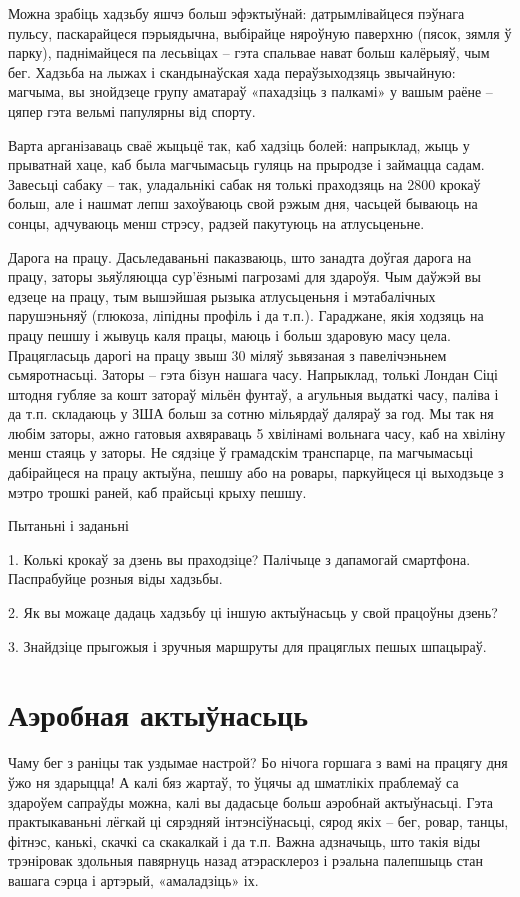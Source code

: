Можна зрабіць хадзьбу яшчэ больш эфэктыўнай: датрымлівайцеся пэўнага пульсу, паскарайцеся пэрыядычна, выбірайце няроўную паверхню (пясок, зямля ў парку), паднімайцеся па лесьвіцах – гэта спальвае нават больш калёрыяў, чым бег. Хадзьба на лыжах і скандынаўская хада пераўзыходзяць звычайную: магчыма, вы знойдзеце групу аматараў «пахадзіць з палкамі» у вашым раёне – цяпер гэта вельмі папулярны від спорту.

Варта арганізаваць сваё жыцьцё так, каб хадзіць болей: напрыклад, жыць у прыватнай хаце, каб была магчымасьць гуляць на прыродзе і займацца садам. Завесьці сабаку – так, уладальнікі сабак ня толькі праходзяць на 2800 крокаў больш, але і нашмат лепш захоўваюць свой рэжым дня, часьцей бываюць на сонцы, адчуваюць менш стрэсу, радзей пакутуюць на атлусьценьне.

Дарога на працу. Дасьледаваньні паказваюць, што занадта доўгая дарога на працу, заторы зьяўляюцца сур'ёзнымі пагрозамі для здароўя. Чым даўжэй вы едзеце на працу, тым вышэйшая рызыка атлусьценьня і мэтабалічных парушэньняў (глюкоза, ліпідны профіль і да т.п.). Гараджане, якія ходзяць на працу пешшу і жывуць каля працы, маюць і больш здаровую масу цела. Працягласьць дарогі на працу звыш 30 міляў зьвязаная з павелічэньнем сьмяротнасьці. Заторы – гэта бізун нашага часу. Напрыклад, толькі Лондан Сіці штодня губляе за кошт затораў мільён фунтаў, а агульныя выдаткі часу, паліва і да т.п. складаюць у ЗША больш за сотню мільярдаў даляраў за год. Мы так ня любім заторы, ажно гатовыя ахвяраваць 5 хвілінамі вольнага часу, каб на хвіліну менш стаяць у заторы. Не сядзіце ў грамадскім транспарце, па магчымасьці дабірайцеся на працу актыўна, пешшу або на ровары, паркуйцеся ці выходзьце з мэтро трошкі раней, каб прайсьці крыху пешшу.

Пытаньні і заданьні

1. Колькі крокаў за дзень вы праходзіце? Палічыце з дапамогай смартфона. Паспрабуйце розныя віды хадзьбы.

2. Як вы можаце дадаць хадзьбу ці іншую актыўнасьць у свой працоўны дзень?

3. Знайдзіце прыгожыя і зручныя маршруты для працяглых пешых шпацыраў.


\section{Аэробная актыўнасьць}

Чаму бег з раніцы так уздымае настрой? Бо нічога горшага з вамі на працягу дня ўжо ня здарыцца! А калі бяз жартаў, то ўцячы ад шматлікіх праблемаў са здароўем сапраўды можна, калі вы дадасьце больш аэробнай актыўнасьці. Гэта практыкаваньні лёгкай ці сярэдняй інтэнсіўнасьці, сярод якіх – бег, ровар, танцы, фітнэс, канькі, скачкі са скакалкай і да т.п. Важна адзначыць, што такія віды трэніровак здольныя павярнуць назад атэрасклероз і рэальна палепшыць стан вашага сэрца і артэрый, «амаладзіць» іх.

